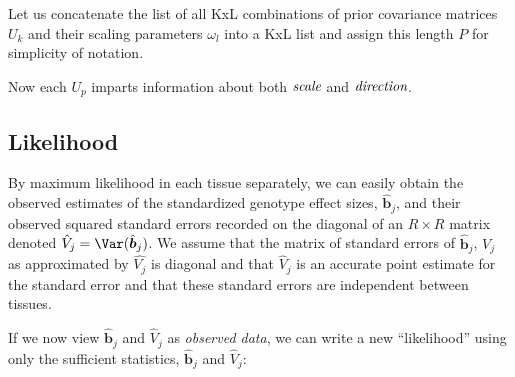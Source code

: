\begin{enumerate}
%
%
%

Let us concatenate the list of all KxL combinations of prior covariance matrices $U_{k}$ and their scaling parameters $\omega_{l}$ into a KxL list and assign this length $P$ for simplicity of notation.

Now each $U_{p}$ imparts information about both $\emph{scale}$ and $\emph{direction}$.


\subsection{Likelihood}

By maximum likelihood in each tissue separately, we can easily obtain the observed estimates of the standardized genotype effect sizes, $\hat{\bm{b}}_{j}$, and their observed squared standard errors recorded on the diagonal of an $R \times R$ matrix denoted $\hat{V}_{j} = \Var(\hat{\bm{b}}_{j})$. 
We assume that the matrix of standard errors of $\hat{\bm{b}}_{j}$, $V_{j}$ as approximated by $\hat{V_{j}}$ is diagonal and  that $\hat{V}_{j}$ is an accurate point estimate for the standard error and that these standard errors are independent between tissues.

If we now view $\hat{\bm{b}}_{j}$ and $\hat{V}_{j}$ as \emph{observed data}, we can write a new ``likelihood'' using only the sufficient statistics,   $\hat{\bm{b}}_{j}$ and $\hat{V}_{j}$:


\end{enumerate}
